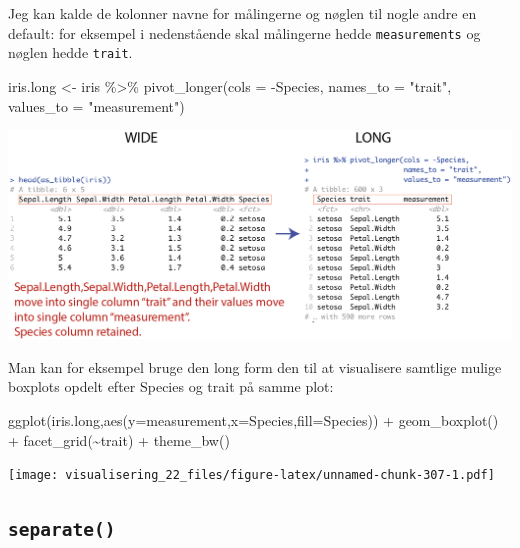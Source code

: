 \documentclass[
]{book}
\newenvironment{Shaded}{\begin{snugshade}}{\end{snugshade}}
\newcommand{\AttributeTok}[1]{\textcolor[rgb]{0.77,0.63,0.00}{#1}}
\newcommand{\FunctionTok}[1]{\textcolor[rgb]{0.00,0.00,0.00}{#1}}
\newcommand{\NormalTok}[1]{#1}
\newcommand{\OtherTok}[1]{\textcolor[rgb]{0.56,0.35,0.01}{#1}}
\newcommand{\SpecialCharTok}[1]{\textcolor[rgb]{0.00,0.00,0.00}{#1}}
\newcommand{\StringTok}[1]{\textcolor[rgb]{0.31,0.60,0.02}{#1}}
\begin{document}
Jeg kan kalde de kolonner navne for målingerne og nøglen til nogle andre en default: for eksempel i nedenstående skal målingerne hedde \texttt{measurements} og nøglen hedde \texttt{trait}.

\begin{Shaded}
\begin{Highlighting}[]
\NormalTok{iris.long }\OtherTok{\textless{}{-}}\NormalTok{ iris }\SpecialCharTok{\%\textgreater{}\%} \FunctionTok{pivot\_longer}\NormalTok{(}\AttributeTok{cols =} \SpecialCharTok{{-}}\NormalTok{Species,}
                                    \AttributeTok{names\_to =} \StringTok{"trait"}\NormalTok{,}
                                    \AttributeTok{values\_to =} \StringTok{"measurement"}\NormalTok{)}
\end{Highlighting}
\end{Shaded}

\includegraphics[width=1\linewidth]{plots/wide_to_long_names}

Man kan for eksempel bruge den long form den til at visualisere samtlige mulige boxplots opdelt efter Species og trait på samme plot:

\begin{Shaded}
\begin{Highlighting}[]
\FunctionTok{ggplot}\NormalTok{(iris.long,}\FunctionTok{aes}\NormalTok{(}\AttributeTok{y=}\NormalTok{measurement,}\AttributeTok{x=}\NormalTok{Species,}\AttributeTok{fill=}\NormalTok{Species)) }\SpecialCharTok{+} 
  \FunctionTok{geom\_boxplot}\NormalTok{() }\SpecialCharTok{+} 
  \FunctionTok{facet\_grid}\NormalTok{(}\SpecialCharTok{\textasciitilde{}}\NormalTok{trait) }\SpecialCharTok{+}
  \FunctionTok{theme\_bw}\NormalTok{()}
\end{Highlighting}
\end{Shaded}

\texttt{[image: visualisering\_22\_files/figure-latex/unnamed-chunk-307-1.pdf]}

\hypertarget{separate}{%
\subsection{\texorpdfstring{\texttt{separate()}}{separate()}}\label{separate}}
\end{document}
